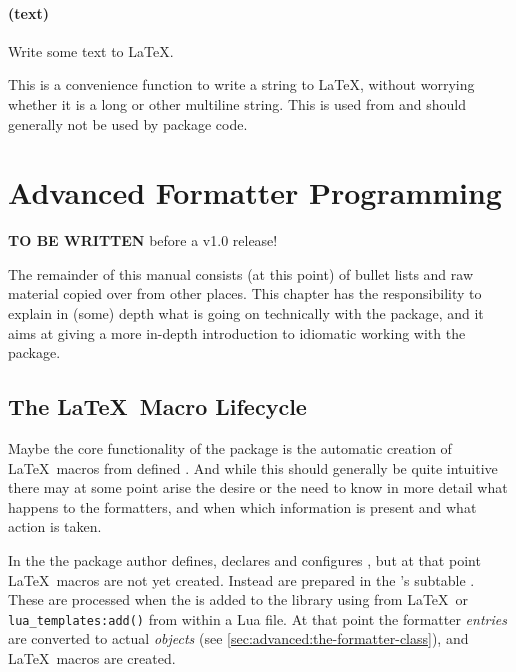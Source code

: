 \documentclass[12pt]{scrartcl}
\begin{document}
\paragraph{ (text)}

Write some text to \LaTeX.

This is a convenience function to write a string to \LaTeX, without worrying
whether it is a long or other multiline string.  This is used from
 and should generally not be used by package code.


\section{Advanced Formatter Programming}
\label{sec:advanced-programming}

\textbf{TO BE WRITTEN} before a v1.0 release!

The remainder of this manual consists (at this point) of bullet lists and raw material copied over from other places. This chapter has the responsibility to explain in (some) depth what is going on technically with the package, and it aims at giving a more in-depth introduction to idiomatic working with the package.



\subsection{The \LaTeX\ Macro Lifecycle}
\label{sec:latex-macro-lifecycle}

Maybe the core functionality of the  package is the
automatic creation of \LaTeX\ macros from defined .
And while this should generally be quite intuitive there may at some point arise
the desire or the need to know in more detail what happens to the formatters,
and when which information is present and what action is taken.

In the  the package author defines, declares and
configures , but at that point \LaTeX\ macros are
not yet created. Instead  are prepared
in the 's subtable .  These are
processed when the  is added to the library using
 from \LaTeX\ or \texttt{lua_templates:add()} from
within a Lua file.  At that point the formatter \emph{entries} are converted to
actual  \emph{objects} (see
\vref{sec:advanced:the-formatter-class}), and \LaTeX\ macros are created.
\end{document}
